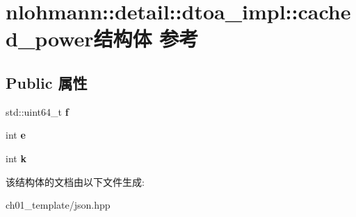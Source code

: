 \hypertarget{structnlohmann_1_1detail_1_1dtoa__impl_1_1cached__power}{}\section{nlohmann\+::detail\+::dtoa\+\_\+impl\+::cached\+\_\+power结构体 参考}
\label{structnlohmann_1_1detail_1_1dtoa__impl_1_1cached__power}
\subsection*{Public 属性}
\begin{DoxyCompactItemize}
\item 
\mbox{\label{structnlohmann_1_1detail_1_1dtoa__impl_1_1cached__power_a21ae81f515f5b08d5bf423775ee56074}} 
std\+::uint64\+\_\+t {\bfseries f}
\item 
\mbox{\label{structnlohmann_1_1detail_1_1dtoa__impl_1_1cached__power_a9e89bc89bb7bf4361f43ea27eed91d23}} 
int {\bfseries e}
\item 
\mbox{\label{structnlohmann_1_1detail_1_1dtoa__impl_1_1cached__power_a8c1f2efed643eeaa8fae83c697a29c6a}} 
int {\bfseries k}
\end{DoxyCompactItemize}


该结构体的文档由以下文件生成\+:\begin{DoxyCompactItemize}
\item 
ch01\+\_\+template/json.\+hpp\end{DoxyCompactItemize}
